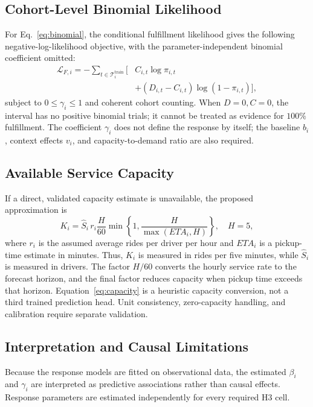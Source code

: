 \documentclass[a4paper,10pt,twocolumn]{article}
\begin{document}
\subsection{Cohort-Level Binomial Likelihood}
For Eq.~\eqref{eq:binomial}, the conditional fulfillment likelihood gives the
following negative-log-likelihood objective, with the parameter-independent
binomial coefficient omitted:
\begin{equation}
\begin{aligned}
 \mathcal L_{F,i}=-\sum_{t\in\mathcal T_i^{\mathrm{train}}}
 \bigl[&C_{i,t}\log\pi_{i,t}\\
 &+(D_{i,t}-C_{i,t})\log(1-\pi_{i,t})\bigr],
\end{aligned}
\label{eq:binnll}
\end{equation}
subject to $0\le\gamma_i\le1$ and coherent cohort counting.
When $D=0,C=0$, the interval has no positive binomial trials; it cannot
be treated as evidence for $100\%$ fulfillment. The coefficient $\gamma_i$
does not define the response by itself; the baseline $b_i$, context effects
$v_i$, and capacity-to-demand ratio are also required.

\subsection{Available Service Capacity}
If a direct, validated capacity estimate is unavailable, the proposed
approximation is
\begin{equation}
 K_i=\widehat S_i\,r_i\frac{H}{60}
 \min\!\left\{1,\frac{H}{\max(ETA_i,H)}\right\},\quad H=5,
 \label{eq:capacity}
\end{equation}
where $r_i$ is the assumed average rides per driver per hour and $ETA_i$ is a
pickup-time estimate in minutes. Thus, $K_i$ is measured in rides per five
minutes, while $\widehat S_i$ is measured in drivers. The factor $H/60$
converts the hourly service rate to the forecast horizon, and the final factor
reduces capacity when pickup time exceeds that horizon.
Equation~\eqref{eq:capacity} is a heuristic capacity conversion, not
a third trained prediction head. Unit consistency, zero-capacity handling,
and calibration require separate validation.

\subsection{Interpretation and Causal Limitations}
Because the response models are fitted on observational data, the estimated
$\beta_i$ and $\gamma_i$ are interpreted as predictive associations rather
than causal effects. Response parameters are estimated independently for
every required H3 cell.
\end{document}
